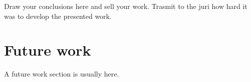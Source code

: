 Draw your conclusions here and sell your work. Trasmit to the juri how hard it was to develop the presented work.


\section{Future work}
A future work section is usually here.

\cleardoublepage
 
